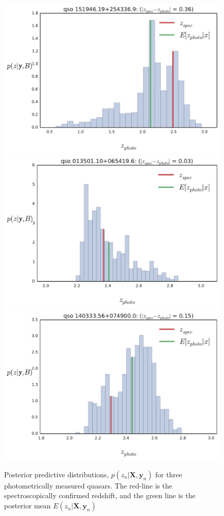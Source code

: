 \documentclass{article}
\begin{document}
\begin{figure}[t]
\vskip 0.2in
\begin{center}
\centerline{
\includegraphics[width=.66\columnwidth]{../figs/quasar_plots/quasar_94_posterior_z}
\includegraphics[width=.66\columnwidth]{../figs/quasar_plots/quasar_49_posterior_z}
\includegraphics[width=.66\columnwidth]{../figs/quasar_plots/quasar_22_posterior_z}
}
\vskip -0.2in
\caption{Posterior predictive distributions, $p(z_n | \mathbf{X}, \mathbf{y}_n)$ for three photometrically measured quasars. The red-line is the spectroscopically confirmed redshift, and the green line is the posterior mean $E(z_n |\mathbf{X}, \mathbf{y}_n)$ }
\label{fig:marginals}
\end{center}
\end{figure}
\end{document}

